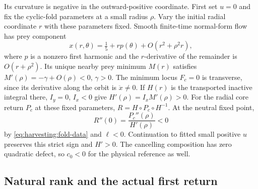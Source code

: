Its curvature is negative in the outward-positive coordinate. First
set \(u=0\) and fix the cyclic-fold parameters at a small radius
\(\rho\). Vary the initial radial coordinate \(r\) with these
parameters fixed. Smooth finite-time normal-form flow has prey component
\[
 x(r,\theta)=\tfrac15+rp(\theta)+O(r^2+\rho^2r),
\]
where \(p\) is a nonzero first harmonic and the \(r\)-derivative
of the remainder is \(O(r+\rho^2)\). Its unique nearby prey minimum
\(M(r)\) satisfies \(M'(\rho)=-\gamma+O(\rho)<0\), \(\gamma>0\).
The minimum locus \(F_c=0\) is transverse, since its derivative
along the orbit is \(\ddot x\ne0\). If \(H(r)\) is the
transported inactive integral there, \(I_y=0\), \(I_x<0\) give
\(H'(\rho)=I_xM'(\rho)>0\). For the radial core return \(P_c\)
at these fixed parameters,
\(R=H\circ P_c\circ H^{-1}\). At the neutral fixed point,
\[
 R''(0)=\frac{P_c''(\rho)}{H'(\rho)}<0
\]
by \eqref{eq:harvesting:fold-data} and \(\ell<0\).
Continuation to fitted small positive \(u\) preserves this strict
sign and \(H'>0\). The cancelling composition has zero quadratic
defect, so \(c_0<0\) for the physical reference as well.

\subsection{Natural rank and the actual first return}

